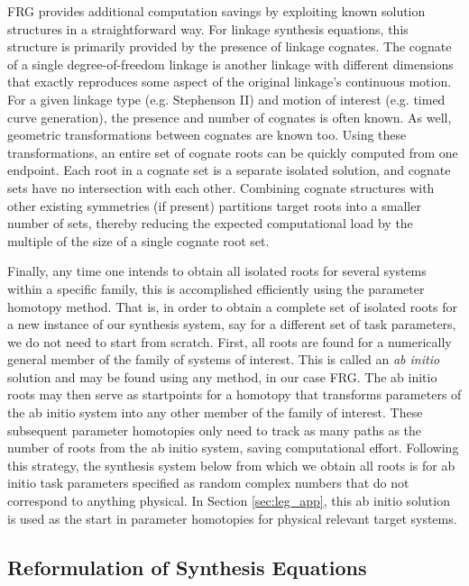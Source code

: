 \documentclass[journal]{IEEEtran}
\begin{document}
FRG provides additional computation savings by exploiting known solution structures in a straightforward way.
For linkage synthesis equations, this structure is primarily provided by the presence of linkage cognates.
The cognate of a single degree-of-freedom linkage is another linkage with different dimensions that exactly reproduces some aspect of the original linkage's continuous motion.
For a given linkage type (e.g. Stephenson II) and motion of interest (e.g. timed curve generation), the presence and number of cognates is often known.
As well, geometric transformations between cognates are known too.
Using these transformations, an entire set of cognate roots can be quickly computed from one endpoint.
Each root in a cognate set is a separate isolated solution, and cognate sets have no intersection with each other.
Combining cognate structures with other existing symmetries (if present) partitions target roots into a smaller number of sets, thereby reducing the expected computational load by the multiple of the size of a single cognate root set.


Finally, any time one intends to obtain all isolated roots for several systems within a specific family, this is accomplished efficiently using the parameter homotopy method.
That is, in order to obtain a complete set of isolated roots for a new instance of our synthesis system, say for a different set of task parameters, we do not need to start from scratch.
First, all roots are found for a numerically general member of the family of systems of interest.
This is called an \textit{ab initio} solution and may be found using any method, in our case FRG.
The ab initio roots may then serve as startpoints for a homotopy that transforms parameters of the ab initio system into any other member of the family of interest.
These subsequent parameter homotopies only need to track as many paths as the number of roots from the ab initio system, saving computational effort.
Following this strategy, the synthesis system below from which we obtain all roots is for ab initio task parameters specified as random complex numbers that do not correspond to anything physical.
In Section \ref{sec:leg_app}, this ab initio solution is used as the start in parameter homotopies for physical relevant target systems.









\subsection{Reformulation of Synthesis Equations}
\label{sec:reform_synth_eq}
\end{document}
